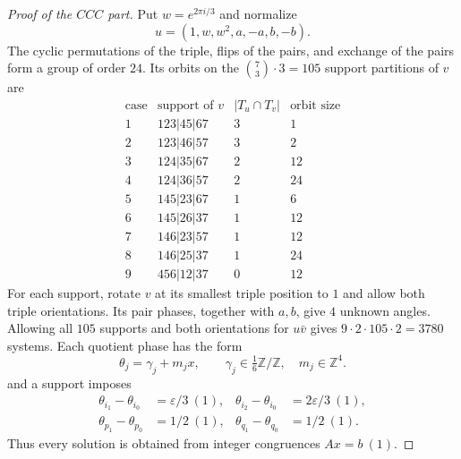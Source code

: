 \documentclass[11pt,a4paper]{article}
\theoremstyle{plain}
\theoremstyle{definition}
\numberwithin{equation}{section}
\begin{document}
\begin{proof}[Proof of the $CCC$ part]
\label{ccc:s:supports}\label{ccc:s:solving}
Put $w=e^{2\pi i/3}$ and normalize
$$u=(1,w,w^2,a,-a,b,-b).$$
The cyclic permutations of the triple, flips of the pairs, and exchange of the pairs form a group of order $24$. Its orbits on the $\binom73\cdot3=105$ support partitions of $v$ are
$$
\begin{array}{c|c|r|r}
\text{case}&\text{support of }v&|T_u\cap T_v|&\text{orbit size}\\ \hline
1&123|45|67&3&1\\
2&123|46|57&3&2\\
3&124|35|67&2&12\\
4&124|36|57&2&24\\
5&145|23|67&1&6\\
6&145|26|37&1&12\\
7&146|23|57&1&12\\
8&146|25|37&1&24\\
9&456|12|37&0&12
\end{array}
$$
For each support, rotate $v$ at its smallest triple position to $1$ and allow both triple orientations. Its pair phases, together with $a,b$, give $4$ unknown angles. Allowing all $105$ supports and both orientations for $u\bar{v}$ gives $9\cdot2\cdot105\cdot2=3780$ systems. Each quotient phase has the form
$$
 \theta_j=\gamma_j+m_jx,\qquad
 \gamma_j\in\tfrac16\mathbb{Z}/\mathbb{Z},\quad m_j\in\mathbb{Z}^4.
$$
and a support imposes
$$
\begin{aligned}
 \theta_{i_1}-\theta_{i_0}&=\varepsilon/3\ (1),&
 \theta_{i_2}-\theta_{i_0}&=2\varepsilon/3\ (1),\\
 \theta_{p_1}-\theta_{p_0}&=1/2\ (1),&
 \theta_{q_1}-\theta_{q_0}&=1/2\ (1).
\end{aligned}
$$
Thus every solution is obtained from integer congruences $Ax=b\ (1)$.


\end{proof}
\end{document}
